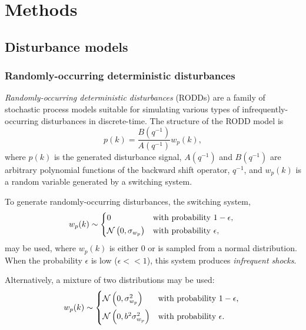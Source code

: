 \chapter{Methods}
\label{chap-methods}


\section{Disturbance models}

\subsection{Randomly-occurring deterministic disturbances}\label{subsec-RODD}

\textit{Randomly-occurring deterministic disturbances} (RODDs) \citep{macgregor_duality_1984} are a family of stochastic process models suitable for simulating various types of infrequently-occurring disturbances in discrete-time.  The structure of the RODD model is
\begin{equation} \label{eq:RODD}
	p(k)= \frac{B(q^{-1})}{A(q^{-1})}w_p(k),
\end{equation}
where $p(k)$ is the generated disturbance signal, $A(q^{-1})$ and $B(q^{-1})$ are arbitrary polynomial functions of the backward shift operator, $q^{-1}$, and $w_p(k)$ is a random variable generated by a switching system.

To generate randomly-occurring disturbances, the switching system,
\begin{equation} \label{eq:wpk1}
w_p(k) \sim 
\begin{cases*}
	0 & with probability $1-\epsilon$, \\
	\mathcal{N}\left(0, \sigma_{w_p}\right) & with probability $\epsilon$,
\end{cases*}
\end{equation}
may be used, where $w_p(k)$ is either 0 or is sampled from a normal distribution.  When the probability $\epsilon$ is low ($\epsilon<<1$), this system produces \textit{infrequent shocks}.

Alternatively, a mixture of two distributions may be used:
\begin{equation} \label{eq:wpk2}
w_p(k) \sim 
	\begin{cases*}
		\mathcal{N}\left(0, \sigma_{w_p}^2\right) & with probability $1-\epsilon$, \\
		\mathcal{N}\left(0, b^2\sigma_{w_p}^2\right) & with probability $\epsilon$.
	\end{cases*}
\end{equation}

